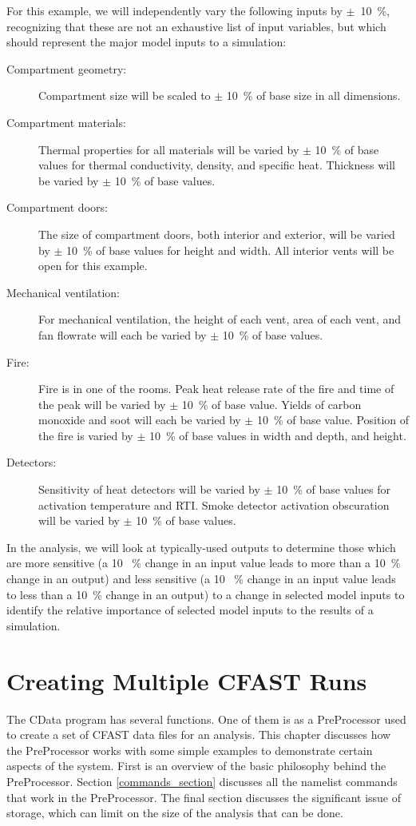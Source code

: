 \documentclass[12pt,twoside]{book}
\begin{document}
For this example, we will independently vary the following inputs by $\pm$~10~\%, recognizing that these are not an exhaustive list of input variables, but which should represent the major model inputs to a simulation:

\begin{description}
\item[Compartment geometry:] Compartment size will be scaled to $\pm$ 10~\% of base size in all dimensions.
\item[Compartment materials:] Thermal properties for all materials will be varied by $\pm$ 10~\% of base values for thermal conductivity, density, and specific heat. Thickness will be  varied by $\pm$ 10~\% of base values.
\item[Compartment doors:] The size of compartment doors, both interior and exterior, will be  varied by $\pm$ 10~\% of base values for height and width. All interior vents will be open for this example.
\item[Mechanical ventilation:] For mechanical ventilation, the height of each vent, area of each vent, and fan flowrate will each be varied by $\pm$ 10~\% of base values.
\item[Fire:] Fire is in one of the rooms. Peak heat release rate of the fire and time of the peak will be varied by $\pm$ 10~\% of base value. Yields of carbon monoxide and soot will each be varied by $\pm$ 10~\% of base value. Position of the fire is varied by $\pm$ 10~\% of base values in width and depth, and height.
\item[Detectors:] Sensitivity of heat detectors will be varied by $\pm$ 10~\% of base values for activation temperature and RTI. Smoke detector activation obscuration will be varied by $\pm$ 10~\% of base values.
\end{description}

In the analysis, we will look at typically-used outputs to determine those which are more sensitive (a 10 ~\% change in an input value leads to more than a 10~\% change in an output) and less sensitive (a 10 ~\% change in an input value leads to less than a 10~\% change in an output) to a change in selected model inputs to identify the relative importance of selected model inputs to the results of a simulation.

%
%

\chapter{Creating Multiple CFAST Runs}
The CData program has several functions. One of them is as a PreProcessor used to create a set of CFAST data files for an analysis. This chapter discusses how the PreProcessor works with some simple examples to demonstrate certain aspects of the system. First is an overview of the basic philosophy behind the PreProcessor. Section \ref{commands_section} discusses all the namelist commands that work in the PreProcessor. The final section discusses the significant issue of storage, which can limit on the size of the analysis that can be done.
\end{document}
